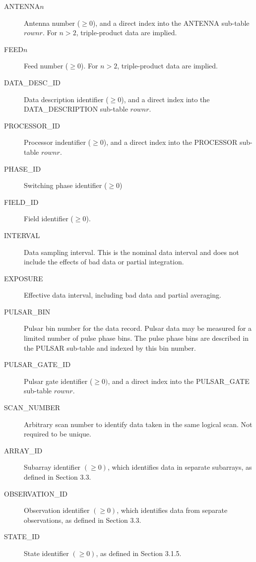 \documentclass{article}
\begin{document}
\begin{itemize}
\begin{description}
\item[ANTENNA$n$] Antenna number ($\geq 0$), and a direct index into
the ANTENNA sub-table $rownr$. For $n > 2$, triple-product data
are implied.

\item[FEED$n$] Feed number ($\geq 0$). For $n > 2$, triple-product
data are implied.

\item[DATA\_DESC\_ID] Data description identifier ($\geq 0$), and
a direct index into the DATA\_DESCRIPTION sub-table $rownr$.

\item[PROCESSOR\_ID] Processor indentifier ($\geq 0$), and a direct
index into the PROCESSOR sub-table $rownr$.

\item[PHASE\_ID] Switching phase identifier ($\geq 0$)

\item[FIELD\_ID] Field identifier ($\geq 0$).

\item[INTERVAL] Data sampling interval. This is the nominal data
interval and does not include the effects of bad data or partial
integration.

\item[EXPOSURE] Effective data interval, including bad data and
partial averaging.

\item[PULSAR\_BIN] Pulsar bin number for the data record. Pulsar data
may be measured for a limited number of pulse phase bins. The pulse
phase bins are described in the PULSAR sub-table and indexed by this
bin number.

\item[PULSAR\_GATE\_ID] Pulsar gate identifier ($\geq 0)$, and a direct
index into the PULSAR\_GATE sub-table $rownr$. 

\item[SCAN\_NUMBER] Arbitrary scan number to identify data taken in
the same logical scan. Not required to be unique.

\item[ARRAY\_ID] Subarray identifier $(\geq 0)$, which identifies data
in separate subarrays, as defined in Section 3.3.

\item[OBSERVATION\_ID] Observation identifier $(\geq 0)$, which identifies
data from separate observations, as defined in Section 3.3.

\item[STATE\_ID] State identifier $(\geq 0)$, as defined in Section 3.1.5.


\end{description}
\end{itemize}
\end{document}
